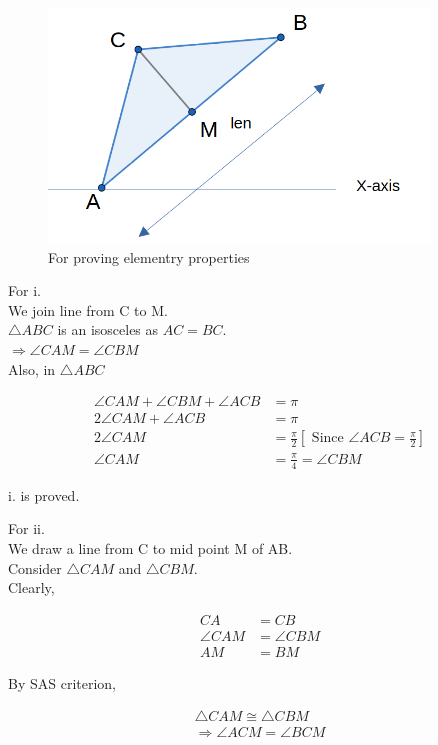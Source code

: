 \documentclass{article}
\begin{document}
\begin{figure}[H]
    \centering
    \includegraphics[width=
    0.9\textwidth]{figures/fig1}
    \caption{For proving elementry properties}
\end{figure}

For i. \\
We join line from C to M.\\
\(\triangle ABC\) is an isosceles as \(AC = BC \). \\
\(\Rightarrow \angle CAM = \angle CBM \)\\
Also, in \(\triangle ABC\)

\begin{align*}
    \angle CAM + \angle CBM +\angle ACB &= \pi \\
   2 \angle CAM + \angle ACB &= \pi \\
   2 \angle CAM &= \frac{\pi}{2} \left[\text{ Since }  \angle ACB = \frac{\pi}{2}  \right]\\
   \angle CAM &= \frac{\pi}{4} = \angle CBM 
\end{align*}

i. is proved. 

For ii. \\
We draw a line from C to mid point M of AB. \\
Consider \(\triangle CAM\) and \(\triangle CBM \). \\
Clearly, 

\begin{align*}
    CA &= CB \\
    \angle CAM &= \angle CBM \\
    AM &= BM
\end{align*}

By SAS criterion,

\begin{align*}
    \triangle CAM \cong \triangle CBM  \\
    \Rightarrow \angle ACM = \angle BCM 
\end{align*}
\end{document}
